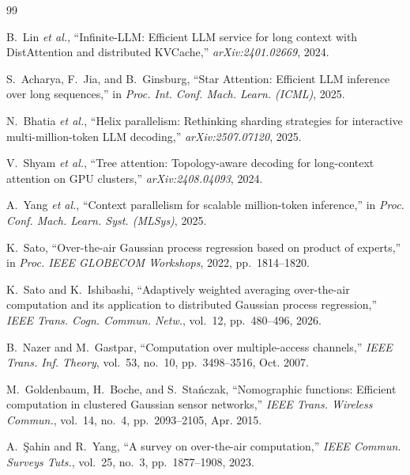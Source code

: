 \begin{thebibliography}{99}

 B.~Lin \emph{et al.}, ``Infinite-LLM: Efficient LLM service for long context with DistAttention and distributed KVCache,'' \emph{arXiv:2401.02669}, 2024.

 S.~Acharya, F.~Jia, and B.~Ginsburg, ``Star Attention: Efficient LLM inference over long sequences,'' in \emph{Proc. Int. Conf. Mach. Learn. (ICML)}, 2025.

 N.~Bhatia \emph{et al.}, ``Helix parallelism: Rethinking sharding strategies for interactive multi-million-token LLM decoding,'' \emph{arXiv:2507.07120}, 2025.

 V.~Shyam \emph{et al.}, ``Tree attention: Topology-aware decoding for long-context attention on GPU clusters,'' \emph{arXiv:2408.04093}, 2024.

 A.~Yang \emph{et al.}, ``Context parallelism for scalable million-token inference,'' in \emph{Proc. Conf. Mach. Learn. Syst. (MLSys)}, 2025.

 K.~Sato, ``Over-the-air Gaussian process regression based on product of experts,'' in \emph{Proc. IEEE GLOBECOM Workshops}, 2022, pp.~1814--1820.

 K.~Sato and K.~Ishibashi, ``Adaptively weighted averaging over-the-air computation and its application to distributed Gaussian process regression,'' \emph{IEEE Trans. Cogn. Commun. Netw.}, vol.~12, pp.~480--496, 2026.

 B.~Nazer and M.~Gastpar, ``Computation over multiple-access channels,'' \emph{IEEE Trans. Inf. Theory}, vol.~53, no.~10, pp.~3498--3516, Oct. 2007.

 M.~Goldenbaum, H.~Boche, and S.~Sta\'nczak, ``Nomographic functions: Efficient computation in clustered Gaussian sensor networks,'' \emph{IEEE Trans. Wireless Commun.}, vol.~14, no.~4, pp.~2093--2105, Apr. 2015.

 A.~\c{S}ahin and R.~Yang, ``A survey on over-the-air computation,'' \emph{IEEE Commun. Surveys Tuts.}, vol.~25, no.~3, pp.~1877--1908, 2023.


\end{thebibliography}
